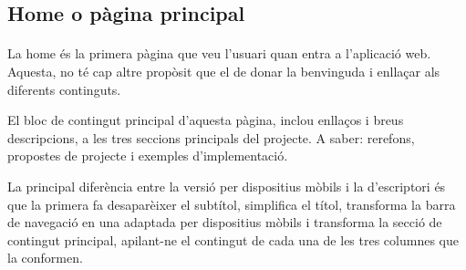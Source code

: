 \subsection{Home o pàgina principal}

    \paragraph{}
    La home és la primera pàgina que veu l'usuari quan entra a l'aplicació web. Aques\-ta, no té cap altre propòsit que el de donar la benvinguda i enllaçar als diferents continguts.

    El bloc de contingut principal d’aquesta pàgina, inclou enllaços i breus des\-crip\-cions, a les tres seccions principals del projecte. A saber: rerefons, propostes de projecte i exemples d'implementació.

    La principal diferència entre la versió per dispositius mòbils i la d'escriptori és que la primera fa desaparèixer el subtítol, simplifica el títol, transforma la barra de navegació en una adaptada per dispositius mòbils i transforma la secció de contingut principal, apilant-ne el contingut de cada una de les tres columnes que la conformen.
